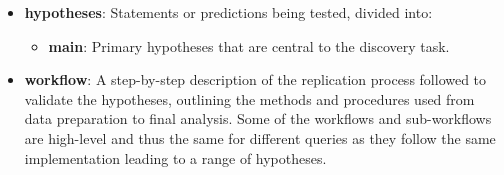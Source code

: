 \begin{itemize}
    
    \item \textbf{hypotheses}: Statements or predictions being tested, divided into:
    \begin{itemize}
        \item \textbf{main}: Primary hypotheses that are central to the discovery task.
    \end{itemize}
    
    \item \textbf{workflow}: A step-by-step description of the replication process followed to validate the hypotheses, outlining the methods and procedures used from data preparation to final analysis. Some of the workflows and sub-workflows are high-level and thus the same for different queries as they follow the same implementation leading to a range of hypotheses. 
    

\end{itemize}
